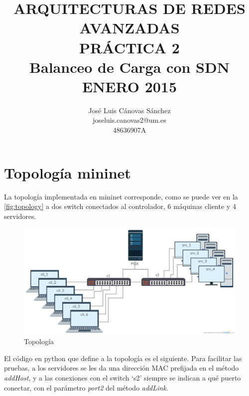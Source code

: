 \documentclass{article}
\author{José Luis Cánovas Sánchez\\joseluis.canovas2@um.es\\48636907A}
\title{ARQUITECTURAS DE REDES AVANZADAS\\PRÁCTICA 2\\Balanceo de Carga con SDN\\ ENERO 2015}
\date{}
\begin{document}
\maketitle

\tableofcontents

\section{Topología mininet}

La topología implementada en mininet corresponde, como se puede ver en la \autoref{fig:topology} a dos switch conectados al controlador, 6 máquinas cliente y 4 servidores.


\begin{figure}[!h]
	\centering
	\includegraphics[scale=0.29]{images/topology.png}
	\caption{Topología}
	\label{fig:topology}
\end{figure}

\hfill

El código en python que define a la topología es el siguiente. Para facilitar las pruebas, a los servidores se les da una dirección MAC prefijada en el método \textit{addHost}, y a las conexiones con el switch `s2'  siempre se indican a qué puerto conectar, con el parámetro \textit{port2} del método \textit{addLink}.
\end{document}
